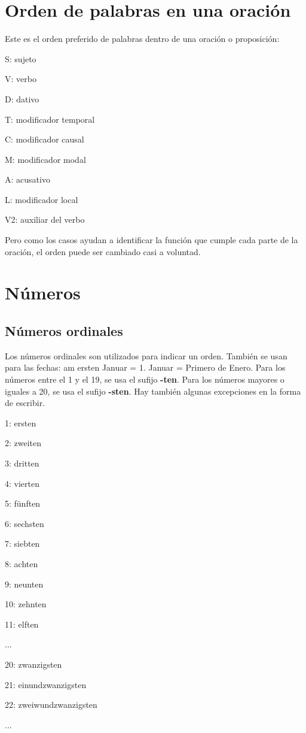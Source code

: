 \section{Orden de palabras en una oración}
Este es el orden preferido de palabras dentro de una oración o proposición:
\begin{myitemize}
\item S: sujeto
\item V: verbo
\item D: dativo
\item T: modificador temporal
\item C: modificador causal
\item M: modificador modal
\item A: acusativo
\item L: modificador local
\item V2: auxiliar del verbo
\end{myitemize}

Pero como los casos ayudan a identificar la función que cumple cada parte de la oración, el orden puede ser cambiado casi a voluntad.

\section{Números}
\subsection{Números ordinales}
Los números ordinales son utilizados para indicar un orden. También se usan para las fechas: am ersten Januar = 1. Januar = Primero de Enero. Para los números entre el 1 y el 19, se usa el sufijo \textbf{-ten}. Para los números mayores o iguales a 20, se usa el sufijo \textbf{-sten}. Hay también algunas excepciones en la forma de escribir.
\begin{multicols}{2}
\begin{myitemize}
\item 1: ersten
\item 2: zweiten
\item 3: dritten
\item 4: vierten
\item 5: fünften
\item 6: sechsten
\item 7: siebten
\item 8: achten
\item 9: neunten
\item 10: zehnten
\item 11: elften
\item ...
\item 20: zwanzigsten
\item 21: einundzwanzigsten
\item 22: zweiwundzwanzigsten
\item ...
\end{myitemize}
\end{multicols}

